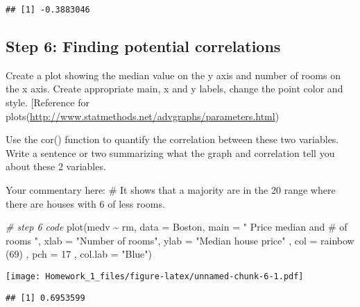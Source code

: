 \documentclass[
]{article}
\newenvironment{Shaded}{\begin{snugshade}}{\end{snugshade}}
\newcommand{\AttributeTok}[1]{\textcolor[rgb]{0.77,0.63,0.00}{#1}}
\newcommand{\CommentTok}[1]{\textcolor[rgb]{0.56,0.35,0.01}{\textit{#1}}}
\newcommand{\DecValTok}[1]{\textcolor[rgb]{0.00,0.00,0.81}{#1}}
\newcommand{\FunctionTok}[1]{\textcolor[rgb]{0.00,0.00,0.00}{#1}}
\newcommand{\NormalTok}[1]{#1}
\newcommand{\SpecialCharTok}[1]{\textcolor[rgb]{0.00,0.00,0.00}{#1}}
\newcommand{\StringTok}[1]{\textcolor[rgb]{0.31,0.60,0.02}{#1}}
\begin{document}
\begin{verbatim}
## [1] -0.3883046
\end{verbatim}

\hypertarget{step-6-finding-potential-correlations}{%
\subsection{Step 6: Finding potential
correlations}\label{step-6-finding-potential-correlations}}

Create a plot showing the median value on the y axis and number of rooms
on the x axis. Create appropriate main, x and y labels, change the point
color and style. {[}Reference for
plots(\url{http://www.statmethods.net/advgraphs/parameters.html})

Use the cor() function to quantify the correlation between these two
variables. Write a sentence or two summarizing what the graph and
correlation tell you about these 2 variables.

Your commentary here: \# It shows that a majority are in the 20 range
where there are houses with 6 of less rooms.

\begin{Shaded}
\begin{Highlighting}[]
\CommentTok{\# step 6 code}
\FunctionTok{plot}\NormalTok{(medv }\SpecialCharTok{\textasciitilde{}}\NormalTok{ rm, }\AttributeTok{data =}\NormalTok{ Boston, }\AttributeTok{main =} \StringTok{" Price median and \# of rooms "}\NormalTok{, }\AttributeTok{xlab =} \StringTok{"Number of rooms"}\NormalTok{, }\AttributeTok{ylab =} \StringTok{"Median house price"}\NormalTok{ , }\AttributeTok{col =} \FunctionTok{rainbow}\NormalTok{ (}\DecValTok{69}\NormalTok{) , }\AttributeTok{pch =} \DecValTok{17}\NormalTok{ , }\AttributeTok{col.lab =} \StringTok{"Blue"}\NormalTok{)}
\end{Highlighting}
\end{Shaded}

\texttt{[image: Homework\_1\_files/figure-latex/unnamed-chunk-6-1.pdf]}

\begin{Shaded}
\end{Shaded}

\begin{verbatim}
## [1] 0.6953599
\end{verbatim}
\end{document}
